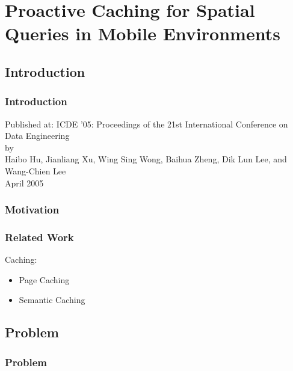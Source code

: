 \section{Proactive Caching for Spatial Queries in Mobile Environments}

\subsection{Introduction}

\begin{frame}
\frametitle{Introduction}
	\begin{center}
	\Large
	Published at: ICDE '05: Proceedings of the 21st International Conference on Data Engineering\\\vspace{1em}
	by\\\vspace{1em}
	Haibo Hu, Jianliang Xu, Wing Sing Wong, Baihua Zheng, Dik Lun Lee, and Wang-Chien Lee\\\vspace{1em}
	April 2005
	\end{center}
\end{frame}


\begin{frame}
\frametitle{Motivation}
\large


\end{frame}


\begin{frame}
\frametitle{Related Work}
\Large

Caching:
\begin{itemize}\itemsep 16pt
\item Page Caching
\item Semantic Caching
\end{itemize}

\end{frame}



\subsection{Problem}

\begin{frame}
\frametitle{Problem}

\end{frame}

